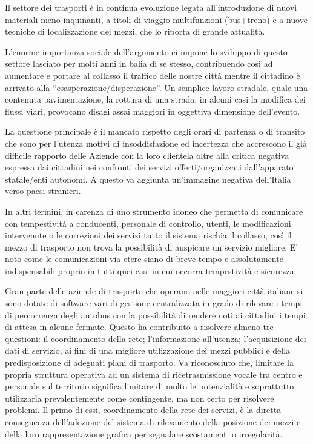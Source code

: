 Il settore dei trasporti è in continua evoluzione legata all'introduzione di nuovi materiali meno inquinanti, a titoli di viaggio multifunzioni (bus+treno) e a nuove tecniche di localizzazione dei mezzi, che lo riporta di grande attualità.

L’enorme importanza sociale dell’argomento ci impone lo sviluppo di questo settore lasciato per molti anni in balia di se stesso, contribuendo così ad aumentare e portare al collasso il traffico delle nostre città mentre il cittadino è arrivato alla “esasperazione/disperazione”.
Un semplice lavoro stradale, quale una contenuta pavimentazione, la rottura di una strada, in alcuni casi la modifica dei flussi viari, provocano disagi assai maggiori in oggettiva dimensione dell'evento.

La questione principale è il mancato rispetto degli orari di partenza o di transito che sono per l'utenza motivi di insoddisfazione ed incertezza che accrescono il già difficile rapporto delle Aziende con la loro clientela oltre alla critica negativa espressa dai cittadini nei confronti dei servizi offerti/organizzati dall’apparato statale/enti autonomi. A questo va aggiunta un’immagine negativa dell’Italia verso paesi stranieri.

In altri termini, in carenza di uno strumento idoneo che permetta di comunicare con tempestività a conducenti, personale di controllo, utenti, le modificazioni intervenute o le correzioni dei servizi tutto il sistema rischia il collasso, così il mezzo di trasporto non trova la possibilità di auspicare un servizio migliore. E' noto come le comunicazioni via etere siano di breve tempo e assolutamente indispensabili proprio in tutti quei casi in cui occorra tempestività e sicurezza.

Gran parte delle aziende di trasporto che operano nelle maggiori città italiane si sono dotate di software vari di gestione centralizzata in grado di rilevare i tempi di percorrenza degli autobus con la possibilità di rendere noti ai cittadini i tempi di attesa in alcune fermate. Questo ha contribuito a risolvere almeno tre questioni: il coordinamento della rete; l'informazione all'utenza; l’acquisizione dei dati di servizio, ai fini di una migliore utilizzazione dei mezzi pubblici e della predisposizione di adeguati piani di trasporto.
Va riconosciuto che, limitare la propria struttura operativa ad un sistema di ricetrasmissione vocale tra centro e personale sul territorio significa limitare di molto le potenzialità e soprattutto, utilizzarla prevalentemente come contingente, ma non certo per risolvere problemi.
Il primo di essi, coordinamento della rete dei servizi, è la diretta conseguenza dell’adozione del sistema di rilevamento della posizione dei mezzi e della loro rappresentazione grafica per segnalare scostamenti o irregolarità.

